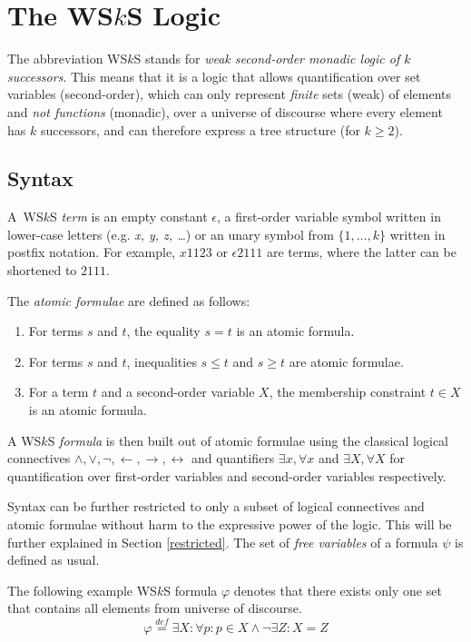 \noindent\hrulefill

\chapter{The WS$k$S Logic}\label{wsks}
The abbreviation WS$k$S stands for \emph{weak second-order monadic logic of $k$
successors}. This means that it is a logic that allows quantification over set
variables (second-order), which can only represent \emph{finite} sets (weak) of
elements and \emph{not functions} (monadic), over a universe of discourse where
every element has $k$ successors, and can therefore express a tree structure
(for $k \geq 2$).
 
 \section{Syntax}
 A~WS$k$S \emph{term} is an empty constant $\epsilon$, a first-order variable
 symbol written in lower-case letters (e.g. \emph{x, y, z, \ldots}) or an unary
 symbol from $\{1,\ldots,k\}$ written in postfix notation.
 For example, $x1123$ or $\epsilon2111$ are terms, where the latter can be
 shortened to $2111$.

The \emph{atomic formulae} are defined as follows:
 \begin{enumerate}
  \item For terms $s$ and $t$, the equality $s = t$ is an atomic formula.
\item For terms $s$ and $t$, inequalities $s \leq t$ and $s \geq t$ are atomic
formulae.
\item For a term $t$ and a second-order variable $X$, the membership constraint
$t \in X$ is an atomic formula.
 \end{enumerate}

A WS$k$S \emph{formula} is then built out of atomic formulae using the
classical logical connectives $\wedge, \vee, \neg, \leftarrow, \rightarrow,
\leftrightarrow$ and quantifiers $\exists x, \forall x$ and $\exists X, \forall
X$ for quantification over first-order variables and second-order variables
respectively.

Syntax can be further restricted to only a subset of logical connectives and
atomic formulae without harm to the expressive power of the logic. This will be
further explained in Section \ref{restricted}. The set of \emph{free variables}
of a formula $\psi$ is defined as usual.
  
  \noindent\hrulefill
  \begin{example}
  The following example WS$k$S formula $\varphi$ denotes that there exists only
  one set that contains all elements from universe of discourse.
  \begin{equation}
   \varphi \overset{\mathit{def}}{=} \exists X: \forall p: p \in X \wedge
   \neg\exists Z:
   X = Z
  \end{equation}
   \hrulefill
  \end{example}\label{wsks-formula}
  
